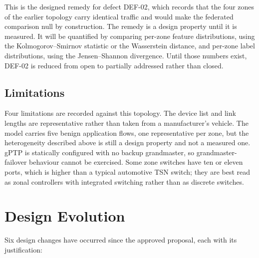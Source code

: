 This is the designed remedy for defect DEF-02, which records that the four zones of the
earlier topology carry identical traffic and would make the federated comparison null
by construction. The remedy is a design property until it is measured. It will be
quantified by comparing per-zone feature distributions, using the
Kolmogorov--Smirnov statistic or the Wasserstein distance, and per-zone label
distributions, using the Jensen--Shannon divergence. Until those numbers exist, DEF-02
is reduced from open to partially addressed rather than closed.

\subsection{Limitations}
Four limitations are recorded against this topology. The device list and link lengths
are representative rather than taken from a manufacturer's vehicle. The model carries five
benign application flows, one representative per zone, but the heterogeneity described
above is still a design property and not a measured one. gPTP is statically configured with no backup grandmaster, so
grandmaster-failover behaviour cannot be exercised. Some zone switches have ten or
eleven ports, which is higher than a typical automotive TSN switch; they are best read
as zonal controllers with integrated switching rather than as discrete switches.

\section{Design Evolution}

Six design changes have occurred since the approved proposal, each with its
justification:


